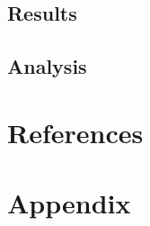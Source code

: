 \documentclass{article}
\begin{document}
    \subsection{Results}
    \subsection{Analysis}

\newpage
\section{References}



\newpage
\section{Appendix}
\renewcommand{\thesection}{\alph{section}}
\setcounter{section}{0}
\end{document}
